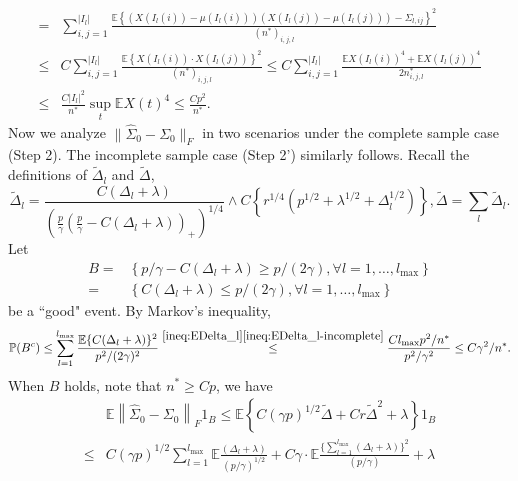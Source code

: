 \documentclass[11pt]{article}
\newcommand{\0}{{\mathbf{0}}}
\newcommand{\1}{{\mathbf{1}}}
\begin{document}
\begin{enumerate}[leftmargin=*]
\begin{equation}
\begin{split}
	= & \sum_{i,j =1}^{|I_l|} \frac{\mathbb{E}\left\{\left(X(I_l(i)) - \mu(I_l(i))\right)\left(X(I_l(j)) - \mu(I_l(j))\right) - \Sigma_{l, ij}\right\}^2}{(n^\ast)_{i,j,l}}\\
	\leq & C\sum_{i,j =1}^{|I_l|} \frac{\mathbb{E}\left\{X(I_l(i)) \cdot X(I_l(j))\right\}^2}{(n^\ast)_{i,j,l}} \leq C\sum_{i, j=1}^{|I_l|}\frac{\mathbb{E}X(I_l(i))^4 + \mathbb{E}X(I_l(j))^4}{2n^\ast_{i,j,l}}\\
	\leq & \frac{C|I_l|^2}{n^\ast} \sup_t \mathbb{E}X(t)^4 \leq \frac{Cp^2}{n^\ast}.
	\end{split}
	\end{equation}
	Now we analyze $\|\hat{\Sigma}_0 - \Sigma_0\|_F$ in two scenarios under the complete sample case (Step 2). The incomplete sample case (Step 2') similarly follows. Recall the definitions of $\tilde{\Delta}_l$ and $\tilde{\Delta}$,
	$$\tilde{\Delta}_l = \frac{C(\Delta_l + \lambda)}{\left(\frac{p}{\gamma}\left(\frac{p}{\gamma} - C(\Delta_l+\lambda)\right)_+\right)^{1/4}}\wedge C\left\{r^{1/4}(p^{1/2}+\lambda^{1/2}+\Delta_l^{1/2})\right\}, \tilde{\Delta} = \sum_l \tilde{\Delta}_l. $$
	Let 
	\begin{equation}\label{eq:B-good-event}
	\begin{split}
	B = & \left\{p/\gamma - C(\Delta_l + \lambda)\geq p/(2\gamma), \forall l=1,\ldots, l_{\max}\right\}\\
	= & \left\{C(\Delta_l + \lambda)\leq p/(2\gamma), \forall l=1,\ldots, l_{\max}\right\}
	\end{split}
	\end{equation}
	be a ``good" event. By Markov's inequality, 
	\begin{equation}\label{ineq:B^c-chance}
	\mathbb{P}(B^c) \leq \sum_{l=1}^{l_{\max}}\frac{\mathbb{E}\{C(\Delta_l+\lambda)\}^2}{p^2/(2\gamma)^2} \overset{\eqref{ineq:EDelta_l}\eqref{ineq:EDelta_l-incomplete}}{\leq} \frac{Cl_{\max} p^2/ n^\ast}{p^2/\gamma^2} \leq C\gamma^2/n^\ast.
	\end{equation} 
	When $B$ holds, note that $n^\ast \geq Cp$, we have
	\begin{equation*}
	\begin{split}
	& \mathbb{E}\left\|\hat{\Sigma}_0 - \Sigma_0\right\|_F 1_B \leq \mathbb{E}\left\{C(\gamma p)^{1/2}\tilde{\Delta} + Cr\tilde{\Delta}^2 + \lambda \right\}1_B \\
	\leq & C(\gamma p)^{1/2}\sum_{l=1}^{l_{\max}}\mathbb{E}\frac{(\Delta_l + \lambda)}{(p/\gamma)^{1/2}} + C\gamma \cdot \mathbb{E}\frac{\{\sum_{l=1}^{l_{\max}}(\Delta_l+\lambda)\}^2}{(p/\gamma)} + \lambda\\

\end{split}
\end{equation*}
\end{enumerate}
\end{document}
